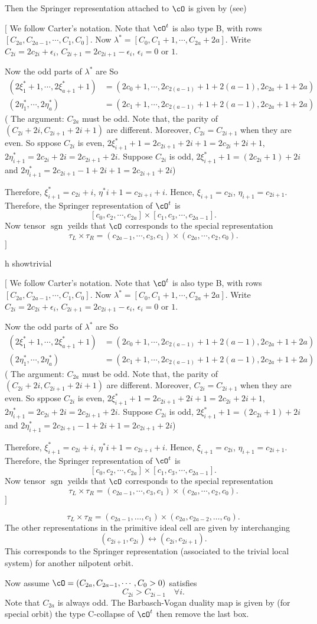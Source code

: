 \documentclass[12pt,a4paper]{amsart}
\newcommand{\trivial}[2][]{\if\relax\detokenize{#1}\relax
  {%
      \color{orange} \vspace{0em} $[$  #2 $]$
      \color{black}
  }
  \else
\ifx#1h
\ifcsname showtrivial\endcsname
{%
    \color{orange} \vspace{0em}  $[$ #2 $]$
    \color{black}
}
\fi
\else {\red Wrong argument!} \fi
\fi
}
\newcommand{\sgn}{\operatorname{sgn}}
\numberwithin{equation}{section}
\theoremstyle{remark}
\begin{document}
Then the Springer representation attached to $\cO$ is given by
(see\cite[p~421]{Carter})

\trivial{
  We follow Carter's notation.
  Note that $\cO^t$ is also type B, with rows $[C_{2a}, C_{2a-1}, \cdots, C_1,
  C_0]$.
  Now $\lambda^* = [C_0, C_1+1, \cdots, C_{2a}+2a]$.
  Write $C_{2i} = 2 c_{2i}+\epsilon_i$, $C_{2i+1} = 2 c_{2i+1}-\epsilon_i$,
  $\epsilon_i = 0$ or  $1$.
  
  Now the odd parts of $\lambda^*$ are 
  So
  \[
    \begin{split}
    (2\xi^*_1+1, \cdots, 2\xi^*_{a+1}+1) &= (2c_0 + 1, \cdots ,2 c_{2(a-1)}+1+2(a-1), 2
    c_{2a} +1 + 2 a)\\
    (2\eta^*_1, \cdots, 2\eta^*_{a}) &= (2c_1 + 1, \cdots ,2 c_{2(a-1)}+1+2(a-1), 2
    c_{2a} +1 + 2 a)
  \end{split}
\]
  ( The argument: $C_{2a}$ must be odd. Note that, the parity of
  $(C_{2i}+2i, C_{2i+1}+2i+1)$ are different. Moreover, $C_{2i}=C_{2i+1}$ when
  they are even. So sppose $C_{2i}$ is even,
  $2\xi^*_{i+1}+1 = 2 c_{2i+1}+2i+1 = 2 c_{2i} + 2i+1$,
  $2\eta^*_{i+1}= 2 c_{2i}+2i = 2 c_{2i+1}+2i$.  Suppose $C_{2i}$ is odd,
  $2\xi^*_{i+1} +1= (2 c_{2i}+1 )+2i$ and $2\eta^*_{i+1} = 2 c_{2i+1}-1 +2i+1 =
  2 c_{2i+1}+2i$)

  Therefore, $\xi^*_{i+1} = c_{2i}+i$, $\eta^*{i+1} = c_{2i+i}+ i$.  
  Hence, $\xi_{i+1} = c_{2i}$, $\eta_{i+1} = c_{2i+1}$.
  Therefore, the Springer representation of $\cO^t$ is
  \[
     [c_0, c_2, \cdots, c_{2a}] \times [c_1, c_3, \cdots, c_{2a-1}] .
  \]
  Now tensor $\sgn$ yeilds that
  $\cO$ corresponds to the special representation
  \[
    \tau_L\times \tau_R = (c_{2a-1}, \cdots, c_3, c_1)\times (c_{2a}, \cdots,
    c_2, c_0).
  \]
}

\begin{equation}
  \label{eq:tableaub}
\tau_L\times\tau_R=(c_{2a-1},\dots ,c_1)\times (c_{2a},c_{2a-2},\dots ,c_0).  
\end{equation}
The other representations in the primitive ideal cell are given by
interchanging 
\[
  (c_{2i+1}, c_{2i})\longleftrightarrow
(c_{2i},c_{2i+1}).
\]
This corresponds to the Springer representation
(associated to the trivial local system) for another nilpotent orbit.


Now assume $\cO = (C_{2a}, C_{2a-1}, \cdots, C_0>0)$ satisfies
\[
  C_{2i} >  C_{2i-1} \quad \forall i.
\]
Note that $C_{2a}$ is always odd.
The Barbasch-Vogan duality map is given by (for special orbit)
the type C-collapse of $\cO^t$ then remove the last box. 
\end{document}
